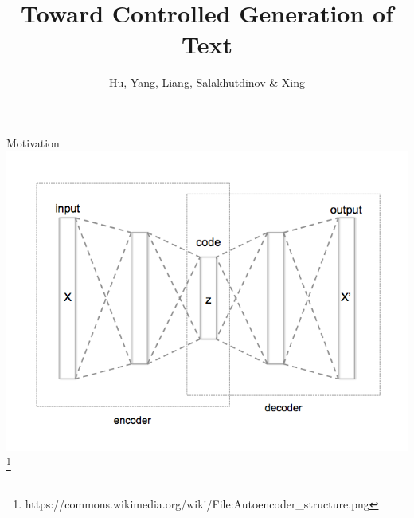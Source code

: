 \documentclass{beamer}
\title{Toward Controlled Generation of Text}
\date{}
\author{Hu, Yang, Liang, Salakhutdinov \& Xing}
\institute{ICML 2017}
\begin{document}
\maketitle

\begin{frame}{Motivation}
	\centering
	\includegraphics[width=.9\textwidth]{images/autoencoder.png}
	{\tiny \footnote{https://commons.wikimedia.org/wiki/File:Autoencoder\_structure.png}}
\end{frame}
\end{document}
